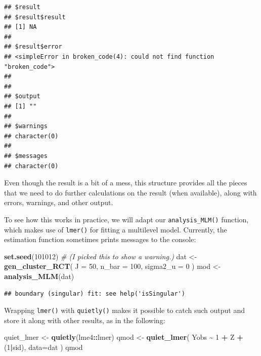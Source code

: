 \documentclass[
]{book}
\newenvironment{Shaded}{\begin{snugshade}}{\end{snugshade}}
\newcommand{\AttributeTok}[1]{\textcolor[rgb]{0.13,0.29,0.53}{#1}}
\newcommand{\CommentTok}[1]{\textcolor[rgb]{0.56,0.35,0.01}{\textit{#1}}}
\newcommand{\DecValTok}[1]{\textcolor[rgb]{0.00,0.00,0.81}{#1}}
\newcommand{\FunctionTok}[1]{\textcolor[rgb]{0.13,0.29,0.53}{\textbf{#1}}}
\newcommand{\NormalTok}[1]{#1}
\newcommand{\OtherTok}[1]{\textcolor[rgb]{0.56,0.35,0.01}{#1}}
\newcommand{\SpecialCharTok}[1]{\textcolor[rgb]{0.81,0.36,0.00}{\textbf{#1}}}
\begin{document}
\begin{verbatim}
## $result
## $result$result
## [1] NA
## 
## $result$error
## <simpleError in broken_code(4): could not find function "broken_code">
## 
## 
## $output
## [1] ""
## 
## $warnings
## character(0)
## 
## $messages
## character(0)
\end{verbatim}

Even though the result is a bit of a mess, this structure provides all the pieces that we need to do further calculations on the result (when available), along with errors, warnings, and other output.

To see how this works in practice, we will adapt our \texttt{analysis\_MLM()} function, which makes use of \texttt{lmer()} for fitting a multilevel model.
Currently, the estimation function sometimes prints messages to the console:

\begin{Shaded}
\begin{Highlighting}[]
\FunctionTok{set.seed}\NormalTok{(}\DecValTok{101012}\NormalTok{)  }\CommentTok{\# (I picked this to show a warning.)}
\NormalTok{dat }\OtherTok{\textless{}{-}} \FunctionTok{gen\_cluster\_RCT}\NormalTok{( }\AttributeTok{J =} \DecValTok{50}\NormalTok{, }\AttributeTok{n\_bar =} \DecValTok{100}\NormalTok{, }\AttributeTok{sigma2\_u =} \DecValTok{0}\NormalTok{ )}
\NormalTok{mod }\OtherTok{\textless{}{-}} \FunctionTok{analysis\_MLM}\NormalTok{(dat)}
\end{Highlighting}
\end{Shaded}

\begin{verbatim}
## boundary (singular) fit: see help('isSingular')
\end{verbatim}

Wrapping \texttt{lmer()} with \texttt{quietly()} makes it possible to catch such output and store it along with other results, as in the following:

\begin{Shaded}
\begin{Highlighting}[]
\NormalTok{quiet\_lmer }\OtherTok{\textless{}{-}} \FunctionTok{quietly}\NormalTok{(lme4}\SpecialCharTok{::}\NormalTok{lmer)}
\NormalTok{qmod }\OtherTok{\textless{}{-}} \FunctionTok{quiet\_lmer}\NormalTok{( Yobs }\SpecialCharTok{\textasciitilde{}} \DecValTok{1} \SpecialCharTok{+}\NormalTok{ Z }\SpecialCharTok{+}\NormalTok{ (}\DecValTok{1}\SpecialCharTok{|}\NormalTok{sid), }\AttributeTok{data=}\NormalTok{dat )}
\NormalTok{qmod}
\end{Highlighting}
\end{Shaded}
\end{document}
